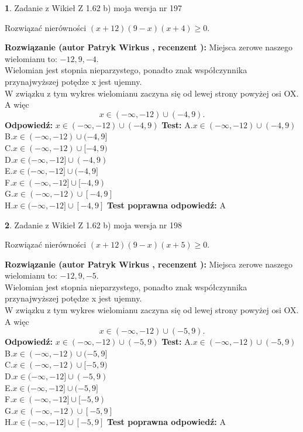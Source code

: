 \documentclass[12pt, a4paper]{article}
\theoremstyle{definition} %
\newtheorem{zad}{}
\newcommand{\zadStart}[1]{\begin{zad}#1\newline}
\newcommand{\zadStop}{\end{zad}}
\newcommand{\rozwStart}[2]{\noindent \textbf{Rozwiązanie (autor #1 , recenzent #2): }\newline}
\newcommand{\rozwStop}{\newline}
\newcommand{\odpStart}{\noindent \textbf{Odpowiedź:}\newline}
\newcommand{\odpStop}{\newline}
\newcommand{\testStart}{\noindent \textbf{Test:}\newline}
\newcommand{\testStop}{\newline}
\newcommand{\kluczStart}{\noindent \textbf{Test poprawna odpowiedź:}\newline}
\newcommand{\kluczStop}{\newline}
\begin{document}
\zadStart{Zadanie z Wikieł Z 1.62 b) moja wersja nr 197}

Rozwiązać nierówności $(x+12)(9-x)(x+4)\ge0$.
\zadStop
\rozwStart{Patryk Wirkus}{}
Miejsca zerowe naszego wielomianu to: $-12, 9, -4$.\\
Wielomian jest stopnia nieparzystego, ponadto znak współczynnika przy\linebreak najwyższej potędze x jest ujemny.\\ W związku z tym wykres wielomianu zaczyna się od lewej strony powyżej osi OX. A więc $$x \in (-\infty,-12) \cup (-4,9).$$
\rozwStop
\odpStart
$x \in (-\infty,-12) \cup (-4,9)$
\odpStop
\testStart
A.$x \in (-\infty,-12) \cup (-4,9)$\\
B.$x \in (-\infty,-12) \cup (-4,9]$\\
C.$x \in (-\infty,-12) \cup [-4,9)$\\
D.$x \in (-\infty,-12] \cup (-4,9)$\\
E.$x \in (-\infty,-12] \cup (-4,9]$\\
F.$x \in (-\infty,-12] \cup [-4,9)$\\
G.$x \in (-\infty,-12) \cup [-4,9]$\\
H.$x \in (-\infty,-12] \cup [-4,9]$
\testStop
\kluczStart
A
\kluczStop



\zadStart{Zadanie z Wikieł Z 1.62 b) moja wersja nr 198}

Rozwiązać nierówności $(x+12)(9-x)(x+5)\ge0$.
\zadStop
\rozwStart{Patryk Wirkus}{}
Miejsca zerowe naszego wielomianu to: $-12, 9, -5$.\\
Wielomian jest stopnia nieparzystego, ponadto znak współczynnika przy\linebreak najwyższej potędze x jest ujemny.\\ W związku z tym wykres wielomianu zaczyna się od lewej strony powyżej osi OX. A więc $$x \in (-\infty,-12) \cup (-5,9).$$
\rozwStop
\odpStart
$x \in (-\infty,-12) \cup (-5,9)$
\odpStop
\testStart
A.$x \in (-\infty,-12) \cup (-5,9)$\\
B.$x \in (-\infty,-12) \cup (-5,9]$\\
C.$x \in (-\infty,-12) \cup [-5,9)$\\
D.$x \in (-\infty,-12] \cup (-5,9)$\\
E.$x \in (-\infty,-12] \cup (-5,9]$\\
F.$x \in (-\infty,-12] \cup [-5,9)$\\
G.$x \in (-\infty,-12) \cup [-5,9]$\\
H.$x \in (-\infty,-12] \cup [-5,9]$
\testStop
\kluczStart
A
\kluczStop
\end{document}
